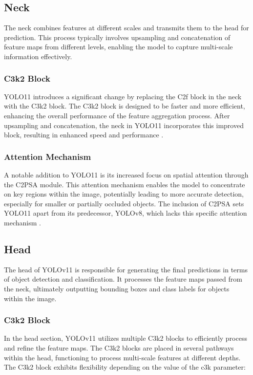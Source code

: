 \documentclass{article}
\begin{document}
\subsection{Neck}
The neck combines features at different scales and transmits them to the head for prediction. This process typically involves upsampling and concatenation of feature maps from different levels, enabling the model to capture multi-scale information effectively.

\subsubsection{C3k2 Block}
YOLO11 introduces a significant change by replacing the C2f block in the neck with the C3k2 block. The C3k2 block is designed to be faster and more efficient, enhancing the overall performance of the feature aggregation process. After upsampling and concatenation, the neck in YOLO11 incorporates this improved block, resulting in enhanced speed and performance \cite{opencvyolov11}.

\subsubsection{Attention Mechanism}
A notable addition to YOLO11 is its increased focus on spatial attention through the C2PSA module. This attention mechanism enables the model to concentrate on key regions within the image, potentially leading to more accurate detection, especially for smaller or partially occluded objects. The inclusion of C2PSA sets YOLO11 apart from its predecessor, YOLOv8, which lacks this specific attention mechanism \cite{opencvyolov11}.

\subsection{Head}
The head of YOLOv11 is responsible for generating the final predictions in terms of object detection and classification. It processes the feature maps passed from the neck, ultimately outputting bounding boxes and class labels for objects within the image.

\subsubsection{C3k2 Block}
In the head section, YOLOv11 utilizes multiple C3k2 blocks to efficiently process and refine the feature maps. The C3k2 blocks are placed in several pathways within the head, functioning to process multi-scale features at different depths. The C3k2 block exhibits flexibility depending on the value of the c3k parameter:
\end{document}

